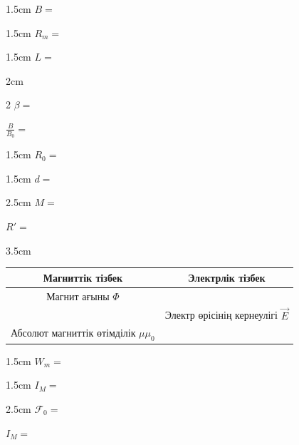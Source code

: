 
\begin{answerbox}{1.5cm}
\(B=\)
\end{answerbox}

\begin{answerbox}{1.5cm}
\(R_m=\)
\end{answerbox}

\begin{answerbox}{1.5cm}
\(L=\)
\end{answerbox}

\begin{answerbox}{2cm}
\begin{multicols}{2}
\(\beta=\)

\columnbreak

\(\frac{B}{B_0}=\)
\end{multicols}
\end{answerbox}

\begin{answerbox}{1.5cm}
\(R_0=\)
\end{answerbox}

\begin{answerbox}{1.5cm}
\(d=\)
\end{answerbox}

\begin{answerbox}{2.5cm}
\(M=\)

\bigskip

\(R'=\)
\end{answerbox}

\begin{answerbox}{3.5cm}
\vspace{-\OlympAnswerGap}
\begin{center}
\begin{tabular}{|c|c|}\hline
\textbf{Магниттік тізбек}&\textbf{Электрлік тізбек}\\\hline
Магнит ағыны \(\Phi\)& \\\hline
& Электр өрісінің кернеулігі \(\vec E\)\\\hline
Абсолют магниттік өтімділік \(\mu\mu_0\)& \\\hline
\end{tabular}
\end{center}
\end{answerbox}

\begin{answerbox}{1.5cm}
\(W_m=\)
\end{answerbox}

\begin{answerbox}{1.5cm}
\(I_M=\)
\end{answerbox}

\begin{answerbox}{2.5cm}
\(\mathcal F_0=\)

\bigskip

\(I_M=\)
\end{answerbox}
